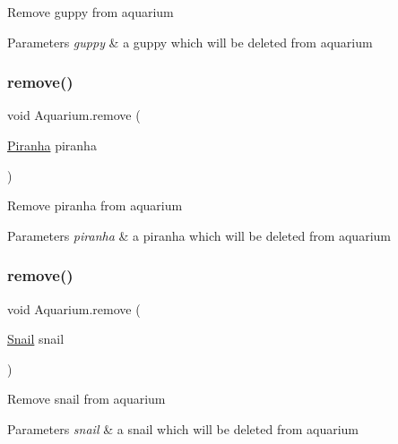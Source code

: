 Remove guppy from aquarium 
\begin{DoxyParams}{Parameters}
{\em guppy} & a guppy which will be deleted from aquarium \\
\hline
\end{DoxyParams}
\mbox{\label{class_aquarium_a7ae9e9230490e7179d90b896ea226071}} 
\subsubsection{\texorpdfstring{remove()}{remove()}\hspace{0.1cm}{\footnotesize\ttfamily [2/5]}}
{\footnotesize\ttfamily void Aquarium.\+remove (\begin{DoxyParamCaption}\item[{\mbox{\hyperlink{class_piranha}{Piranha}}}]{piranha }\end{DoxyParamCaption})\hspace{0.3cm}{\ttfamily [inline]}}

Remove piranha from aquarium 
\begin{DoxyParams}{Parameters}
{\em piranha} & a piranha which will be deleted from aquarium \\
\hline
\end{DoxyParams}
\mbox{\label{class_aquarium_a2c283c3325865e62469a426498443cd0}} 
\subsubsection{\texorpdfstring{remove()}{remove()}\hspace{0.1cm}{\footnotesize\ttfamily [3/5]}}
{\footnotesize\ttfamily void Aquarium.\+remove (\begin{DoxyParamCaption}\item[{\mbox{\hyperlink{class_snail}{Snail}}}]{snail }\end{DoxyParamCaption})\hspace{0.3cm}{\ttfamily [inline]}}

Remove snail from aquarium 
\begin{DoxyParams}{Parameters}
{\em snail} & a snail which will be deleted from aquarium \\
\hline
\end{DoxyParams}
\mbox{\label{class_aquarium_a63e4f95aafbfc1cc2e081254dac69fd8}} 

